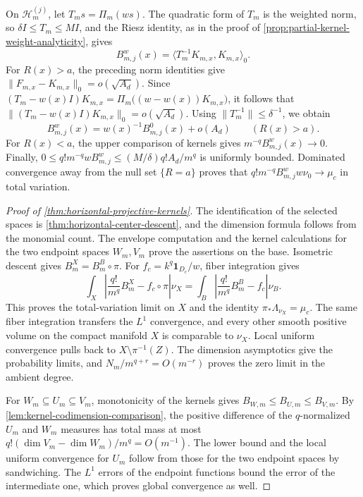 On $\mathcal H_m^{(j)}$, let $T_ms=\Pi_m(ws)$. The quadratic form of $T_m$ is the weighted norm, so $\delta I\leq T_m\leq MI$, and the Riesz identity, as in the proof of \cref{prop:partial-kernel-weight-analyticity}, gives
\[
 B_{m,j}^w(x)=\langle T_m^{-1}K_{m,x},K_{m,x}\rangle_0.
\]
For $R(x)>a$, the preceding norm identities give
$\|F_{m,x}-K_{m,x}\|_0=o(\sqrt{A_d})$. Since $(T_m-w(x)I)K_{m,x}=\Pi_m\bigl((w-w(x))K_{m,x}\bigr)$, it follows that
$\|(T_m-w(x)I)K_{m,x}\|_0=o(\sqrt{A_d})$.
Using $\|T_m^{-1}\|\leq\delta^{-1}$, we obtain
\[
 B_{m,j}^w(x)=w(x)^{-1}B_{m,j}^0(x)+o(A_d)
       \qquad(R(x)>a).
\]
For $R(x)<a$, the upper comparison of kernels gives $m^{-q}B_{m,j}^w(x)\to0$.
Finally, $0\leq q!m^{-q}wB_{m,j}^w\leq(M/\delta)q!A_d/m^q$ is uniformly bounded. Dominated convergence away from the null set $\{R=a\}$ proves that
$q!m^{-q}B_{m,j}^w w\nu_0\to\mu_c$ in total variation.

\begin{proof}[Proof of \cref{thm:horizontal-projective-kernels}]
The identification of the selected spaces is \cref{thm:horizontal-center-descent}, and the dimension formula follows from the monomial count. The envelope computation and the kernel calculations for the two endpoint spaces $W_m,V_m$ prove the assertions on the base. Isometric descent gives $B_m^X=B_m^B\circ\pi$.
For $f_c=k^q\mathbf1_{D_c}/w$, fiber integration gives
\[
 \int_X\left|\frac{q!}{m^q}B_m^X-f_c\circ\pi\right|\nu_X
 =\int_B\left|\frac{q!}{m^q}B_m^B-f_c\right|\nu_B.
\]
This proves the total-variation limit on $X$ and the identity $\pi_*\Lambda_{\nu_X}=\mu_c$. The same fiber integration transfers the $L^1$ convergence, and every other smooth positive volume on the compact manifold $X$ is comparable to $\nu_X$. Local uniform convergence pulls back to $X\setminus\pi^{-1}(Z)$. The dimension asymptotics give the probability limits, and $N_m/m^{q+r}=O(m^{-r})$ proves the zero limit in the ambient degree.

For $W_m\subseteq U_m\subseteq V_m$, monotonicity of the kernels gives $B_{W,m}\leq B_{U,m}\leq B_{V,m}$. By \cref{lem:kernel-codimension-comparison}, the positive difference of the $q$-normalized $U_m$ and $W_m$ measures has total mass at most $q!(\dim V_m-\dim W_m)/m^q=O(m^{-1})$. The lower bound and the local uniform convergence for $U_m$ follow from those for the two endpoint spaces by sandwiching. The $L^1$ errors of the endpoint functions bound the error of the intermediate one, which proves global convergence as well.
\end{proof}

